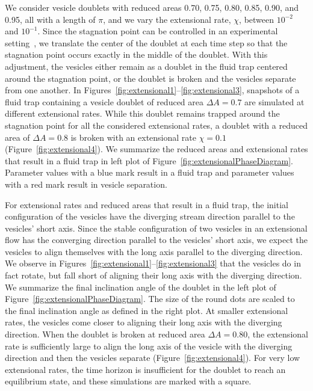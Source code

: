 \documentclass[prf,superscriptaddress,showpacs]{revtex4-1}
\begin{document}
We consider vesicle doublets with reduced areas 0.70, 0.75, 0.80, 0.85,
0.90, and 0.95, all with a length of $\pi$, and we vary the extensional
rate, $\chi$, between $10^{-2}$ and $10^{-1}$.  Since the stagnation
point can be controlled in an experimental
setting~\cite{Johnson-Chavarria2011_EMJ}, we translate the center of the
doublet at each time step so that the stagnation point occurs exactly in
the middle of the doublet.  With this adjustment, the vesicles either
remain as a doublet in the fluid trap centered around the stagnation
point, or the doublet is broken and the vesicles separate from one
another.  In Figures~\ref{fig:extensional1}--\ref{fig:extensional3},
snapshots of a fluid trap containing a vesicle doublet of reduced area
$\Delta A = 0.7$ are simulated at different extensional rates.  While
this doublet remains trapped around the stagnation point for all the
considered extensional rates, a doublet with a reduced area of $\Delta A
= 0.8$ is broken with an extensional rate $\chi = 0.1$
(Figure~\ref{fig:extensional4}).  We summarize the reduced areas and
extensional rates that result in a fluid trap in left plot of
Figure~\ref{fig:extensionalPhaseDiagram}. Parameter values with a blue
mark result in a fluid trap and parameter values with a red mark result
in vesicle separation.

For extensional rates and reduced areas that result in a fluid trap, the
initial configuration of the vesicles have the diverging stream
direction parallel to the vesicles' short axis.  Since the stable
configuration of two vesicles in an extensional flow has the converging
direction parallel to the vesicles' short axis, we expect the vesicles
to align themselves with the long axis parallel to the diverging
direction.  We observe in
Figures~\ref{fig:extensional1}--\ref{fig:extensional3} that the vesicles
do in fact rotate, but fall short of aligning their long axis with the
diverging direction.  We summarize the final inclination angle of the
doublet in the left plot of Figure~\ref{fig:extensionalPhaseDiagram}.
The size of the round dots are scaled to the final inclination angle as
defined in the right plot.  At smaller extensional rates, the vesicles
come closer to aligning their long axis with the diverging direction.
When the doublet is broken at reduced area $\Delta A = 0.80$, the
extensional rate is sufficiently large to align the long axis of the
vesicle with the diverging direction and then the vesicles separate
(Figure~\ref{fig:extensional4}).  For very low extensional rates, the
time horizon is insufficient for the doublet to reach an equilibrium
state, and these simulations are marked with a square.
\end{document}
